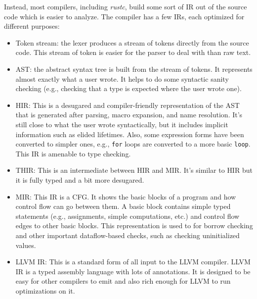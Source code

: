 \documentclass[paper=a4,%
  twoside,%
  BCOR4mm,%
  abstract=true,%
  toc=bibliography,%
  chapterprefix=true,%
  toc=bibliographynumbered,%
  open=right,%
  english,%
  pagesize=pdftex]{scrreprt}
\newcommand{\hir}{\ac{HIR}\xspace}
\newcommand{\mir}{\ac{MIR}\xspace}
\newcommand{\cfg}{\ac{CFG}\xspace}
\begin{document}
Instead, most compilers, including \emph{rustc}, build some sort of \ac{IR} out of the source code which is easier to analyze. The compiler has a few \acp{IR}, each optimized for different purposes:

\begin{itemize}
    \item Token stream: the lexer produces a stream of tokens directly from the source code. This stream of token is easier for the parser to deal with than raw text.
    \item \ac{AST}: the abstract syntax tree is built from the stream of tokens. It represents almost exactly what a user wrote. It helps to do some syntactic sanity checking (e.g., checking that a type is expected where the user wrote one).
    \item \hir: This is a desugared and compiler-friendly representation of the \ac{AST} that is generated after parsing, macro expansion, and name resolution. It's still close to what the user wrote syntactically, but it includes implicit information such as elided lifetimes. Also, some expression forms have been converted to simpler ones, e.g., \texttt{for} loops are converted to a more basic \texttt{loop}. This \ac{IR} is amenable to type checking.
    \item \ac{THIR}: This is an intermediate between \hir and \mir. It's similar to \hir but it is fully typed and a bit more desugared.
    \item \mir: This \ac{IR} is a \cfg. It shows the basic blocks of a program and how control flow can go between them. A basic block contains simple typed statements (e.g., assignments, simple computations, etc.) and control flow edges to other basic blocks. This representation is used to for borrow checking and other important dataflow-based checks, such as checking uninitialized values.
    \item LLVM \ac{IR}: This is a standard form of all input to the LLVM compiler. LLVM \ac{IR} is a typed assembly language with lots of annotations. It is designed to be easy for other compilers to emit and also rich enough for LLVM to run optimizations on it.
\end{itemize}
\end{document}
